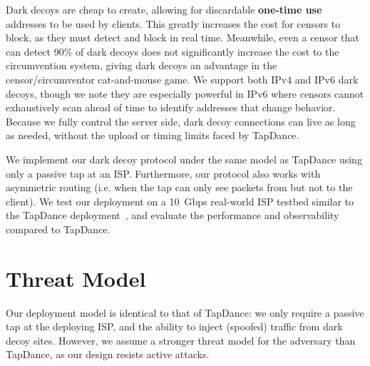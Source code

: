 \documentclass[letterpaper,twocolumn,10pt]{article}
\begin{document}
Dark decoys are cheap to create, allowing for discardable \textbf{one-time use}
addresses to be used by clients. This greatly increases the cost for censors to
block, as they must detect and block in real time. Meanwhile, even a censor that
can detect 90\% of dark decoys does not significantly increase the cost to the
circumvention system, giving dark decoys an advantage in the censor/circumventor
cat-and-mouse game.
We support both IPv4 and IPv6 dark decoys, though we note they are especially
powerful in IPv6 where censors cannot exhaustively scan ahead of time to
identify addresses that change behavior.
Because we fully control the server side, dark decoy connections can live as
long as needed, without the upload or timing limits faced by TapDance.





We implement our dark decoy protocol under the same model as TapDance using
only a passive tap at an ISP. Furthermore, our protocol also works with
asymmetric routing (i.e. when the tap can only see packets from but not to the
client). We test our deployment on a 10~Gbps real-world ISP testbed similar to the
TapDance deployment~\cite{frolov2017isp}, and evaluate the performance and
observability compared to TapDance.






\section{Threat Model}


Our deployment model is identical to that of TapDance: we only require a passive
tap at the deploying ISP, and the ability to inject (spoofed) traffic from dark
decoy sites. However, we assume a stronger threat model for the adversary than
TapDance, as our design resists active attacks.
\end{document}

